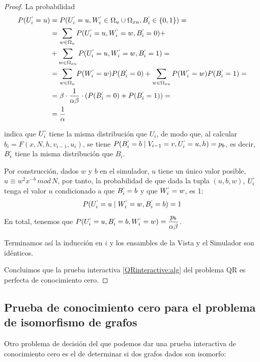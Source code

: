 \begin{proof}
	La probabilidad
	\begin{align*}
	P(U_i^`=u)  & = P(U_i^`=u, W_i^`\in \Omega_u \cup \Omega_{xu}, B_i^` \in \{0,1\}) = \\
				&= \sum_{w\in \Omega_u} P(U_i^`=u, W_i^`=w, B_i^` = 0) + \\
				& +	\sum_{w\in \Omega_{xu}} P(U_i^`=u, W_i^`=w, B_i^` = 1) = \\
				&= \sum_{w\in \Omega_u} P(W_i^`=w)P(B_i^` = 0) + \sum_{w\in \Omega_{xu}} P(W_i^`=w)P(B_i^` = 1) = \\
				&=\beta \cdot \frac{1}{\alpha \beta} \cdot (P(B_i^`=0) + P(B_i^`=1)) = \\
				&= \frac{1}{\alpha}
	\end{align*}
	
	indica que $U_i^`$ tiene la misma distribución que $U_i$, de modo que, al calcular $b_{i} = F(x,N,h,v_{i-1},u_{i})$, se tiene 
	$P(B_i^`=b \mid V_{i-1}=v, U_i^`=u,h) = p_b$, es decir, $B_i^`$ tiene la misma distribución que $B_i$.
	
	
	Por construcción, dados $w$ y $b$ en el simulador, $u$ tiene un único valor posible, $u\equiv w^2x^{-b}\,mod\,N$, por tanto, la probabilidad de que dada la tupla $(u, b, w)$, $U_i^`$ tenga el valor $u$ condicionado a que $ B_i^`=b$ y que $W_i^`=w$, es 1:
	\[P(U_i^`=u \mid W_i^`=w, B_i^`=b) = 1\]
	
	
	\hfil
	
	En total, tenemos que $P(U_i^`=u, B_i^`=b, W_i^`=w) = \dfrac{p_b}{\alpha \beta}$.
	
	
	Terminamos así la inducción en $i$ y los ensambles de la Vista y el Simulador son idénticos.
	
	\hfil
	
	Concluimos que la prueba interactiva \ref{QRinteractive:alg} del problema QR es perfecta de conocimiento cero.
	
\end{proof}



\subsection{Prueba de conocimiento cero para el problema de isomorfismo de grafos}


Otro problema de decisión del que podemos dar una prueba interactiva de conocimiento cero es el de determinar si dos grafos dados son isomorfo:




